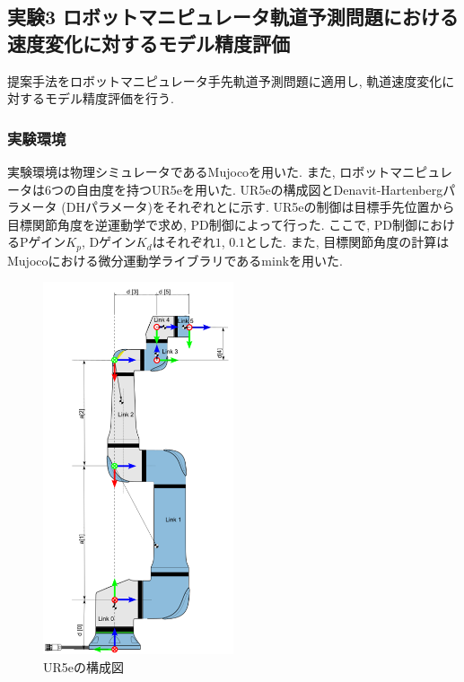 \subsection{実験3 ロボットマニピュレータ軌道予測問題における速度変化に対するモデル精度評価}
提案手法をロボットマニピュレータ手先軌道予測問題に適用し, 軌道速度変化に対するモデル精度評価を行う.

\subsubsection{実験環境}
実験環境は物理シミュレータであるMujoco\cite{mujoco}を用いた.
また, ロボットマニピュレータは6つの自由度を持つUR5eを用いた.
UR5eの構成図とDenavit-Hartenbergパラメータ (DHパラメータ)をそれぞれとに示す\cite{ur5e}.
UR5eの制御は目標手先位置から目標関節角度を逆運動学で求め, PD制御によって行った.
ここで, PD制御におけるPゲイン$K_p$, Dゲイン$K_d$はそれぞれ$1$, $0.1$とした.
また, 目標関節角度の計算はMujocoにおける微分運動学ライブラリであるmink\cite{mink}を用いた.
\begin{figure}[htbp]
    \centering
    \includegraphics[width=0.5\textwidth]{Static/ur5e_structure.png}
    \caption{UR5eの構成図}
    \label{fig:ur5e:structure}
\end{figure}

